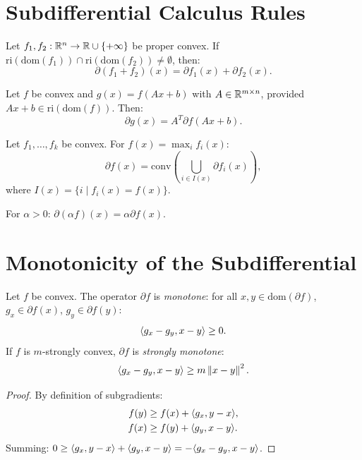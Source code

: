 \section{Subdifferential Calculus Rules}

\begin{theorem}
\label{thm:mr_sum}
Let $f_1, f_2 : \mathbb{R}^n \to \mathbb{R} \cup \{+\infty\}$ be proper convex. If
$\mathrm{ri}(\mathrm{dom}(f_1)) \cap \mathrm{ri}(\mathrm{dom}(f_2)) \neq \emptyset$,
then:
\[
    \partial(f_1 + f_2)(x) = \partial f_1(x) + \partial f_2(x).
\]
\end{theorem}

\begin{theorem}
\label{thm:chain}
Let $f$ be convex and $g(x) = f(Ax + b)$ with $A \in \mathbb{R}^{m \times n}$,
provided $Ax + b \in \mathrm{ri}(\mathrm{dom}(f))$. Then:
\[
    \partial g(x) = A^T \partial f(Ax + b).
\]
\end{theorem}

\begin{theorem}
Let $f_1, \ldots, f_k$ be convex. For $f(x) = \max_i f_i(x)$:
\[
    \partial f(x) = \mathrm{conv}\left(\bigcup_{i \in I(x)} \partial f_i(x)\right),
\]
where $I(x) = \{i \mid f_i(x) = f(x)\}$.
\end{theorem}

\begin{proposition}[Scaling]
For $\alpha > 0$: $\partial(\alpha f)(x) = \alpha \partial f(x)$.
\end{proposition}

\section{Monotonicity of the Subdifferential}

\begin{theorem}[Monotonicity]
\label{thm:monotonicity}
Let $f$ be convex. The operator $\partial f$ is \emph{monotone}: for all
$x, y \in \mathrm{dom}(\partial f)$, $g_x \in \partial f(x)$,
$g_y \in \partial f(y)$:
\[
    \langle g_x - g_y, x - y \rangle \geq 0.
\]
If $f$ is $m$-strongly convex, $\partial f$ is \emph{strongly monotone}:
\[
    \langle g_x - g_y, x - y \rangle \geq m\left\| x - y \right\|^2.
\]
\end{theorem}

\begin{proof}
By definition of subgradients:
\begin{align*}
    f(y) &\geq f(x) + \langle g_x, y - x \rangle, \\
    f(x) &\geq f(y) + \langle g_y, x - y \rangle.
\end{align*}
Summing: $0 \geq \langle g_x, y-x \rangle + \langle g_y, x-y \rangle = -\langle g_x - g_y, x-y \rangle$.
\end{proof}

